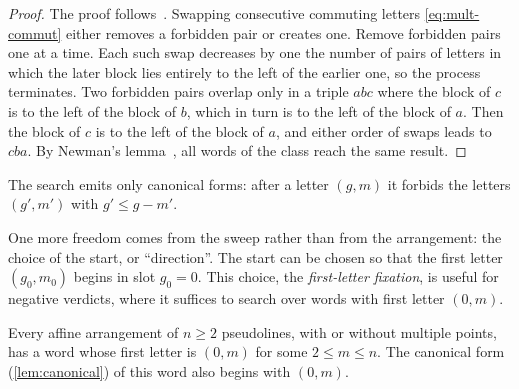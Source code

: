 \begin{proof}
The proof follows~\cite[Lemma~4.7]{pu26b}. Swapping consecutive commuting letters \eqref{eq:mult-commut} either removes a forbidden pair or creates one. Remove forbidden pairs one at a time. Each such swap decreases by one the number of pairs of letters in which the later block lies entirely to the left of the earlier one, so the process terminates. Two forbidden pairs overlap only in a triple $abc$ where the block of $c$ is to the left of the block of $b$, which in turn is to the left of the block of $a$. Then the block of $c$ is to the left of the block of $a$, and either order of swaps leads to $cba$. By Newman's lemma~\cite{newman42}, all words of the class reach the same result.
\end{proof}

The search emits only canonical forms: after a letter $(g,m)$ it forbids the letters $(g',m')$ with $g'\le g-m'$.

One more freedom comes from the sweep rather than from the arrangement: the choice of the start, or ``direction''.
The start can be chosen so that the first letter $(g_0,m_0)$ begins in slot $g_0=0$.
This choice, the \emph{first-letter fixation}, is useful for negative verdicts, where it suffices to search over words with first letter $(0,m)$.

\begin{lemma}[first letter $g_0=0$]\label{lem:first-letter}
Every affine arrangement of $n\ge2$ pseudolines, with or without multiple points, has a word whose first letter is $(0,m)$ for some $2\le m\le n$.
The canonical form (\cref{lem:canonical}) of this word also begins with $(0,m)$.
\end{lemma}

